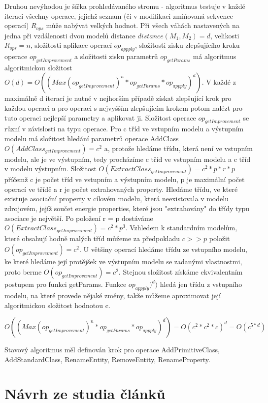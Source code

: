 \documentclass[11pt,twoside,a4paper]{book}
\begin{document}
Druhou nevýhodou je šířka prohledávaného stromu - algoritmus testuje v každé
iteraci všechny operace, jejichž seznam (či v modifikaci zmiňovaná sekvence
operací) $R_{ops}$ může nabývat velkých hodnot. Při všech váhách nastavených na
jedna při vzdálenosti dvou modelů distance $distance(M_1,M_2) = d$, velikosti
$R_{ops} = n$, složitosti aplikace operací $op_{appply}$, složitosti zisku zlepšujícího kroku operace
$op_{getImprovement}$ a složitosti zisku parametrů $op_{getParams}$
má algoritmus algoritmickou složitost $O(d) = O((Max(op_{getImprovement})^n *
op_{getParams} * op_{appply})^d)$. V každé z maximálně d iterací je nutné v
nejhorším případě získat zlepšující krok pro každou operaci a pro operaci s
nejvyšším zlepšujícím krokem potom nalézt pro tuto operaci nejlepší parametry a
aplikovat ji. Složitost operace $op_{getImprovement}$ se různí v závislosti na
typu operace. Pro c tříd ve vstupním modelu a výstupním modelu má složitost
hledání parametrů operace AddClass $O(AddClass_{getImprovement})= c^2$ a,
protože hledáme třídu, která není ve vstupním modelu, ale je ve výstupním, tedy
procházíme c tříd ve vstupním modelu a c tříd v modelu výstupním. Složitost
$O(ExtractClass_{getImprovement})= c^2 * p * r * p $ příčemž c je počet tříd ve
vstupním a výstupním modelu, p je maximální počet operací ve třídě a r je počet
extrahovaných property. Hledáme třídu, ve které existuje asociační property v
cílovém modelu, která neexistovala v modelu zdrojovém, jejíž součet energie
properties, které jsou "extrahovány" do třídy typu asociace je největší.
Po položení r = p dostáváme $O(ExtractClass_{getImprovement})= c^2 * p^3 $.
Vzhledem k standardním modelům, které obsahují hodně malých tříd můžeme za
předpokladu $c >> p$ položit $O(op_{getImprovement})= c^2$. U většiny
operací hledáme třídu ze vstupního modelu, ke které hledáme její protějšek ve
výstupním modelu se zadanými vlastnostmi, proto berme $O(op_{getImprovement})= c^2$. Stejnou
složitost získáme ekvivalentním postupem pro funkci getParams.
Funkce $op_{appply})^d)$ hledá jen třídu z vstupního modelu, na které
provede nějaké změny, takže můžeme aproximovat její algoritmickou složitost
hodnotou c.

$O((Max(op_{getImprovement})^n * op_{getParams} * op_{appply})^d) = O(c^2 * c^2
* c)^d = O(c^{5*d})$

Stavový algoritmus měl definován krok pro operace AddPrimitiveClass,
AddStandardClass, RenameEntity, RemoveEntity, RenameProperty.
 
 \section{Návrh ze studia článků}
 
\end{document}
